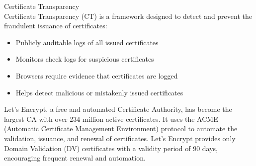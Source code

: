 \begin{concept}{Certificate Transparency}\\
Certificate Transparency (CT) is a framework designed to detect and prevent the fraudulent issuance of certificates:
\begin{itemize}
    \item Publicly auditable logs of all issued certificates
    \item Monitors check logs for suspicious certificates
    \item Browsers require evidence that certificates are logged
    \item Helps detect malicious or mistakenly issued certificates
\end{itemize}
\end{concept}

\begin{example}
Let's Encrypt, a free and automated Certificate Authority, has become the largest CA with over 234 million active certificates. It uses the ACME (Automatic Certificate Management Environment) protocol to automate the validation, issuance, and renewal of certificates. Let's Encrypt provides only Domain Validation (DV) certificates with a validity period of 90 days, encouraging frequent renewal and automation.
\end{example}